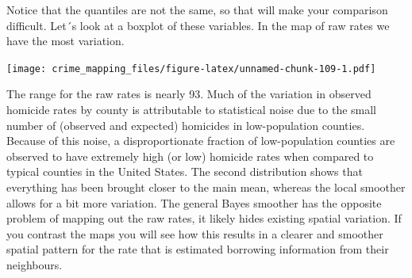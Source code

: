 \documentclass[
]{book}
\newenvironment{Shaded}{\begin{snugshade}}{\end{snugshade}}
\newcommand{\AttributeTok}[1]{\textcolor[rgb]{0.77,0.63,0.00}{#1}}
\newcommand{\CommentTok}[1]{\textcolor[rgb]{0.56,0.35,0.01}{\textit{#1}}}
\newcommand{\FunctionTok}[1]{\textcolor[rgb]{0.00,0.00,0.00}{#1}}
\newcommand{\NormalTok}[1]{#1}
\newcommand{\SpecialCharTok}[1]{\textcolor[rgb]{0.00,0.00,0.00}{#1}}
\newcommand{\StringTok}[1]{\textcolor[rgb]{0.31,0.60,0.02}{#1}}
\begin{document}
Notice that the quantiles are not the same, so that will make your comparison difficult. Let´s look at a boxplot of these variables. In the map of raw rates we have the most variation.

\begin{Shaded}
\end{Shaded}

\texttt{[image: crime\_mapping\_files/figure-latex/unnamed-chunk-109-1.pdf]}

The range for the raw rates is nearly 93. Much of the variation in observed homicide rates by county is attributable to statistical noise due to the small number of (observed and expected) homicides in low-population counties. Because of this noise, a disproportionate fraction of low-population counties are observed to have extremely high (or low) homicide rates when compared to typical counties in the United States. The second distribution shows that everything has been brought closer to the main mean, whereas the local smoother allows for a bit more variation. The general Bayes smoother has the opposite problem of mapping out the raw rates, it likely hides existing spatial variation. If you contrast the maps you will see how this results in a clearer and smoother spatial pattern for the rate that is estimated borrowing information from their neighbours.
\end{document}
